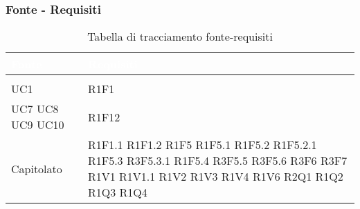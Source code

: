 \subsubsection{Fonte - Requisiti}
\renewcommand{\arraystretch}{1.5}
\begin{center}
\begin{longtable}{C{6cm} C{6cm}}
		\textcolor{white}{\textbf{Fonte}} & 
		\textcolor{white}{\textbf{Requisiti}}\\
		\endfirsthead
	    \\
	    \endfoot
	    \caption{Tabella di tracciamento fonte-requisiti}
	    \endlastfoot

UC1 &  	R1F1\\
			  
UC7 \newline UC8 \newline UC9 \newline UC10 \newline & R1F12 \\

Capitolato &  	R1F1.1 \newline
				R1F1.2 \newline
				R1F5 \newline
				R1F5.1 \newline
				R1F5.2 \newline
				R1F5.2.1 \newline
				R1F5.3 \newline
				R3F5.3.1 \newline
				R1F5.4 \newline
				R3F5.5 \newline
				R3F5.6 \newline
				R3F6 \newline
				R3F7 \newline
				R1V1 \newline
				R1V1.1 \newline
				R1V2 \newline
				R1V3 \newline
				R1V4 \newline
				R1V6 \newline
				R2Q1 \newline
				R1Q2 \newline
				R1Q3 \newline
				R1Q4 \\


\end{longtable}
\end{center}
